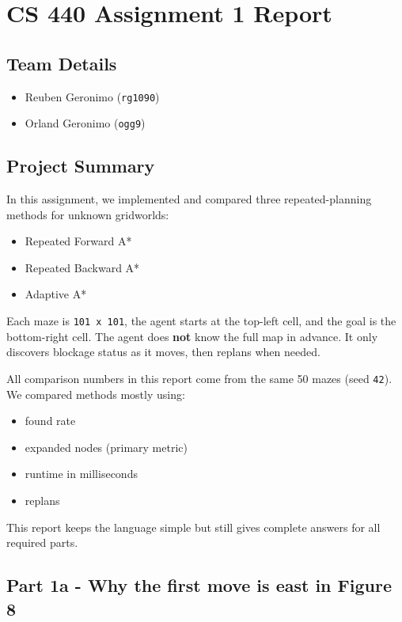 \documentclass[11pt]{article}
\begin{document}
\section*{CS 440 Assignment 1 Report}

\subsection*{Team Details}

\begin{itemize}[leftmargin=*]
\item Reuben Geronimo (\texttt{rg1090})
\item Orland Geronimo (\texttt{ogg9})
\end{itemize}

\subsection*{Project Summary}

In this assignment, we implemented and compared three repeated-planning methods for unknown gridworlds:

\begin{itemize}[leftmargin=*]
\item Repeated Forward A*
\item Repeated Backward A*
\item Adaptive A*
\end{itemize}

Each maze is \texttt{101 x 101}, the agent starts at the top-left cell, and the goal is the bottom-right cell. The agent does \textbf{not} know the full map in advance. It only discovers blockage status as it moves, then replans when needed.

All comparison numbers in this report come from the same 50 mazes (seed \texttt{42}). We compared methods mostly using:

\begin{itemize}[leftmargin=*]
\item found rate
\item expanded nodes (primary metric)
\item runtime in milliseconds
\item replans
\end{itemize}

This report keeps the language simple but still gives complete answers for all required parts.

\subsection*{Part 1a - Why the first move is east in Figure 8}
\end{document}
